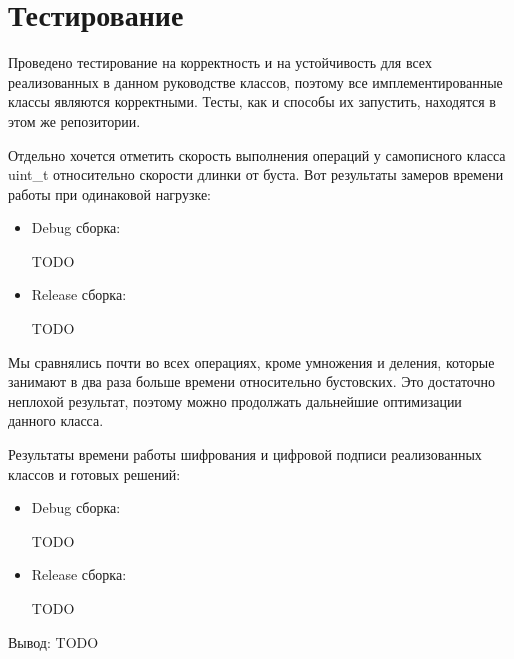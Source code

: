 
\section{Тестирование}
Проведено тестирование на корректность и на устойчивость для всех реализованных в данном руководстве классов, поэтому все имплементированные классы являются корректными. Тесты, как и способы их запустить, находятся в этом же репозитории.

Отдельно хочется отметить скорость выполнения операций у самописного класса uint\_t относительно скорости длинки от буста. Вот результаты замеров времени работы при одинаковой нагрузке:
\begin{itemize}
  \item Debug сборка:

    TODO

  \item Release сборка:

    TODO
\end{itemize}

Мы сравнялись почти во всех операциях, кроме умножения и деления, которые занимают в два раза больше времени относительно бустовских. Это достаточно неплохой результат, поэтому можно продолжать дальнейшие оптимизации данного класса.

Результаты времени работы шифрования и цифровой подписи реализованных классов и готовых решений:
\begin{itemize}
  \item Debug сборка:

    TODO

  \item Release сборка:

    TODO
\end{itemize}

Вывод: TODO

